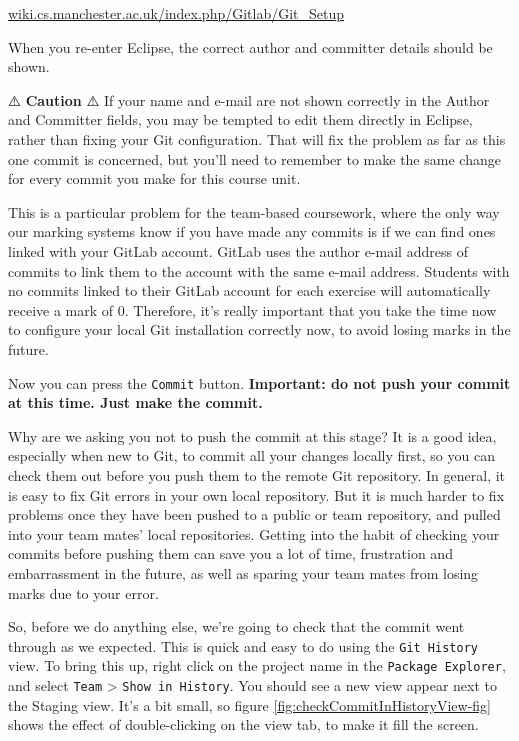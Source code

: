 \documentclass[
]{book}
\begin{document}
\href{https://wiki.cs.manchester.ac.uk/index.php/Gitlab/Git_Setup}{wiki.cs.manchester.ac.uk/index.php/Gitlab/Git\_Setup}

When you re-enter Eclipse, the correct author and committer details should be shown.

⚠️ \textbf{Caution} ⚠️
If your name and e-mail are not shown correctly in the Author and Committer fields, you may be tempted to edit them directly in Eclipse, rather than fixing your Git configuration. That will fix the problem as far as this one commit is concerned, but you'll need to remember to make the same change for every commit you make for this course unit.

This is a particular problem for the team-based coursework, where the only way our marking systems know if you have made any commits is if we can find ones linked with your GitLab account. GitLab uses the author e-mail address of commits to link them to the account with the same e-mail address. Students with no commits linked to their GitLab account for each exercise will automatically receive a mark of 0. Therefore, it's really important that you take the time now to configure your local Git installation correctly now, to avoid losing marks in the future.

Now you can press the \texttt{Commit} button. \textbf{Important: do not push your commit at this time. Just make the commit.}

Why are we asking you not to push the commit at this stage? It is a good idea, especially when new to Git, to commit all your changes locally first, so you can check them out before you push them to the remote Git repository. In general, it is easy to fix Git errors in your own local repository. But it is much harder to fix problems once they have been pushed to a public or team repository, and pulled into your team mates' local repositories. Getting into the habit of checking your commits before pushing them can save you a lot of time, frustration and embarrassment in the future, as well as sparing your team mates from losing marks due to your error.

So, before we do anything else, we're going to check that the commit went through as we expected. This is quick and easy to do using the \texttt{Git\ History} view. To bring this up, right click on the project name in the \texttt{Package\ Explorer}, and select \texttt{Team} \textgreater{} \texttt{Show\ in\ History}. You should see a new view appear next to the Staging view. It's a bit small, so figure \ref{fig:checkCommitInHistoryView-fig} shows the effect of double-clicking on the view tab, to make it fill the screen.
\end{document}
